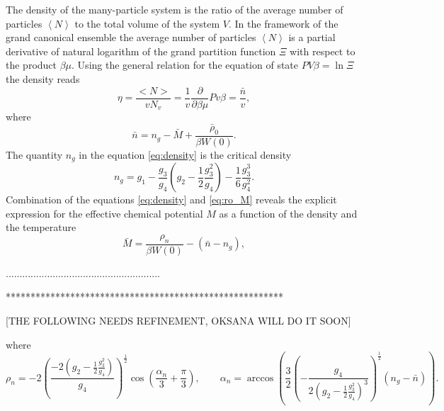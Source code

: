 \documentclass[12pt]{article}
\begin{document}
	The density of the many-particle system is the ratio of the average number of particles $\left\langle N \right\rangle$  to the total volume of the system $V$.
	In the framework of the grand canonical ensemble the average number of particles $\left\langle N \right\rangle$ is a partial derivative of natural logarithm of the grand partition function $\Xi$ with respect to the product $\beta \mu$. Using the general relation for the equation of state $PV\beta = \ln \Xi $ the density reads
	\begin{equation}
	\eta = \frac{<N>}{v N_v} = \frac{1}{v} \frac{\partial}{\partial\beta\mu} Pv\beta = \frac{\bar n}{v},
	\end{equation} 
	where	
	\begin{equation}\label{eq:density}
	\bar n = n_g - \bar{M} + \frac{ \bar \rho_0}{\beta W(0)}.
	\end{equation}
	The quantity $n_g$ in the equation \eqref{eq:density} is the critical density
	\begin{equation}\label{eq:crit_dens}
	n_g = g_1 - \frac{g_3}{g_4}\left(  g_2 - \frac{1}{2} \frac{g_3^2}{g_4}\right) - \frac{1}{6} \frac{g_3^3}{g_4^2}.
	\end{equation}
	Combination of the equations \eqref{eq:density} and \eqref{eq:ro_M} reveals the explicit expression for the effective chemical potential $M$ as a function of the density and the temperature
	\begin{equation}\label{eq:M_nT}
		\bar M = \frac{\rho_{n}}{\beta W(0)} - (\bar n - n_g),
	\end{equation}
	
	........................................................
	
	********************************************************
	
	[THE FOLLOWING NEEDS REFINEMENT, OKSANA WILL DO IT SOON] 
	
	where
	\begin{equation} \label{eq:ro_nT}
		 \rho_{n} = - 2 \left(\frac{-2\left(  g_2 - \frac{1}{2} \frac{g_3^2}{g_4}\right)}{g_4}\right)^{\frac{1}{2}} \cos \left( \frac{\alpha_n}{3} + \frac{\pi}{3} \right), \qquad 	\alpha_n = \arccos \left( \frac{3}{2} \left( - \frac{g_4}{2\left(  g_2 - \frac{1}{2} \frac{g_3^2}{g_4}\right)^3}\right)^{\frac{1}{2}} (n_g - \bar n)\right). 
	\end{equation}
	
\end{document}
